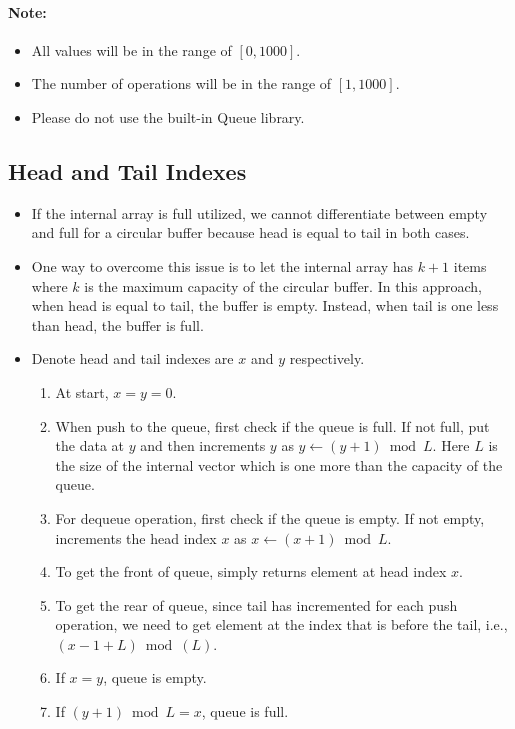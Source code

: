  

\paragraph{Note:}

\begin{itemize}
\item  All values will be in the range of $[0, 1000]$.
\item The number of operations will be in the range of $[1, 1000]$.
\item Please do not use the built-in Queue library.
\end{itemize}

\subsection{Head and Tail Indexes}
\begin{itemize}
\item If the internal array is full utilized, we cannot differentiate between empty and full for a circular buffer because head is equal to tail in both cases.
\item One way to overcome this issue is to let the internal array has $k+1$ items where $k$ is the maximum capacity of the circular buffer. In this approach, when head is equal to tail, the buffer is empty. Instead, when tail is one less than head, the buffer is full.
\item Denote head and tail indexes are $x$ and $y$ respectively.
\begin{enumerate}
\item At start, $x=y=0$.
\item When push to the queue, first check if the queue is full. If not full, put the data at $y$ and then increments $y$ as $y\gets (y+1) \bmod L$. Here $L$ is the size of the internal vector which is one more than the capacity of the queue.
\item For dequeue operation, first check if the queue is empty. If not empty, increments the head index $x$ as $x\gets (x+1) \bmod L$.
\item To get the front of queue, simply returns element at head index $x$.
\item To get the rear of queue, since tail has incremented for each push operation, we need to get element at the index that is before the tail, i.e., $(x-1+L)\bmod(L)$.
\item If $x=y$, queue is empty.
\item If $(y+1)\bmod L = x$, queue is full.
\end{enumerate}
\end{itemize}
